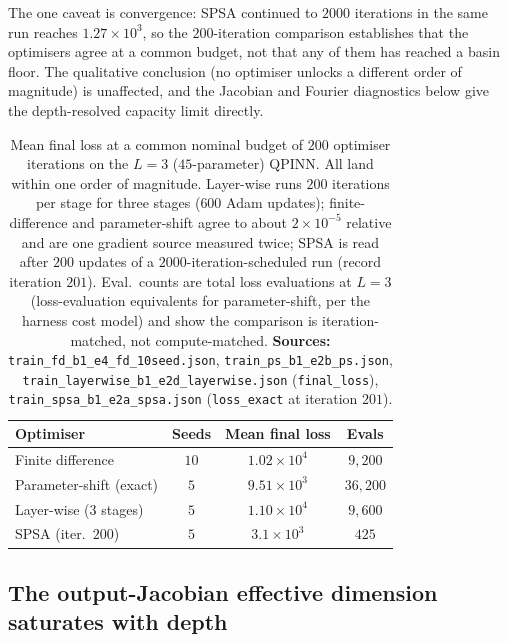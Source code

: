 \documentclass[a4paper,12pt]{iopart}
\begin{document}
The one caveat is convergence: SPSA continued to $2000$ iterations in the same
run reaches $1.27\times10^{3}$, so the $200$-iteration comparison establishes
that the optimisers agree at a common budget, not that any of them has reached a
basin floor. The qualitative conclusion (no optimiser unlocks a different order
of magnitude) is unaffected, and the Jacobian and Fourier diagnostics below give
the depth-resolved capacity limit directly.

\begin{table}[htbp]
  \centering
  \caption{Mean final loss at a common nominal budget of $200$ optimiser
    iterations on the $L=3$
    ($45$-parameter) QPINN. All land within one order of magnitude. Layer-wise
    runs $200$ iterations per stage for three stages ($600$ Adam updates);
    finite-difference and parameter-shift agree to about $2\times10^{-5}$
    relative and
    are one gradient source measured twice; SPSA is read after $200$ updates of
    a $2000$-iteration-scheduled run (record iteration $201$). Eval.\ counts are
    total loss evaluations at $L=3$ (loss-evaluation equivalents for
    parameter-shift, per the harness cost model) and show the comparison is
    iteration-matched, not compute-matched. \textbf{Sources:}
    \texttt{train\_fd\_b1\_e4\_fd\_10seed.json},
    \texttt{train\_ps\_b1\_e2b\_ps.json},
    \texttt{train\_layerwise\_b1\_e2d\_layerwise.json} (\texttt{final\_loss}),
    \texttt{train\_spsa\_b1\_e2a\_spsa.json}
    (\texttt{loss\_exact} at iteration $201$).}
  \label{tab:optimiser}
  \begin{tabular}{lccc}
    \toprule
    Optimiser & Seeds & Mean final loss & Evals \\
    \midrule
    Finite difference        & $10$ & $1.02\times10^{4}$ & $9{,}200$ \\
    Parameter-shift (exact)  & $5$  & $9.51\times10^{3}$ & $36{,}200$ \\
    Layer-wise ($3$ stages)  & $5$  & $1.10\times10^{4}$ & $9{,}600$ \\
    SPSA (iter.\ $200$)      & $5$  & $3.1\times10^{3}$  & $425$ \\
    \bottomrule
  \end{tabular}
\end{table}

\subsection{The output-Jacobian effective dimension saturates with depth}
\label{ssec:jacobian}
\end{document}
